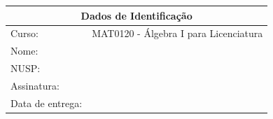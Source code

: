 \documentclass[oneside,a4paper,12pt]{article}
\theoremstyle{Colorido}
\theoremstyle{solu}
\theoremstyle{dotlessP}
\newcommand{\disciplina}{MAT0120 - Álgebra I para Licenciatura}
\newcommand{\entrega}{ }
\begin{document}
	\begin{tabular}{ |l|p{12cm}| }
		
		\hline
		\multicolumn{2}{|c|}{\textbf{Dados de Identificação}} \\
			\hline
		Curso:        &  \disciplina \\
			\hline
		Nome:        &  \\
		\hline
		NUSP:      &  \\
		\hline
				Assinatura:      &  \\
		\hline
				Data de entrega:      &  \entrega \\
		\hline
	\end{tabular}
	
	\vspace{24pt}
	\vspace{40pt}
	\tableofcontents

	\newpage	
\end{document}
